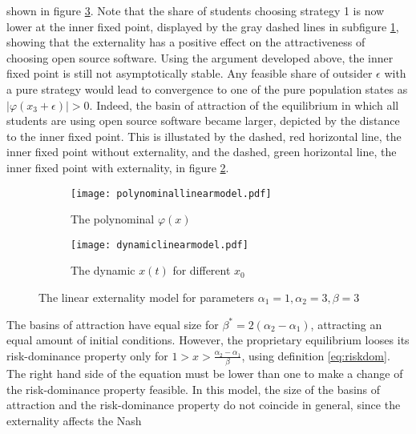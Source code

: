 shown in figure \ref{fig:plotmodellinear}.
Note that the share of students choosing strategy 1 is now lower at the 
inner fixed point, displayed by the gray dashed lines in subfigure 
\ref{fig:externalitypolynominal}, showing that the externality has a positive 
effect on the attractiveness of choosing open source software. 
Using the argument developed above, the inner fixed point is still not
asymptotically stable. Any feasible share of outsider $\epsilon$ 
with a pure strategy would lead to convergence to one of the 
pure population states as $|\varphi(x_3+\epsilon)|>0$.
Indeed, the basin of attraction of the equilibrium in which all 
students are using open source software became larger, 
depicted by the distance to the inner fixed point.
This is illustated by the dashed, red horizontal line, 
the inner fixed point without externality, and the dashed, green horizontal 
line, the inner fixed point with externality, 
in figure \ref{fig:dynamiclinear}.
\begin{figure}[h]
        \centering
        \begin{subfigure}{.5\textwidth}
        \centering
        \texttt{[image: polynominallinearmodel.pdf]}
        \caption[Polynominal of the externality model]{The polynominal $\varphi(x)$} 
        \label{fig:externalitypolynominal}
        \end{subfigure}%
        \begin{subfigure}{.5\textwidth}
        \centering
        \texttt{[image: dynamiclinearmodel.pdf]}
        \caption[Replicator dynamic of the model with externality]{The dynamic $x(t)$ for different $x_0$} 
        \label{fig:dynamiclinear}
        \end{subfigure}%
        \caption[Polynominal and Dynamic of the model with externality]
        {The linear externality 
                model for parameters $\alpha_1=1,\alpha_2=3,\beta=3$}
        \label{fig:plotmodellinear}
\end{figure}
The basins of attraction have equal size for $\beta^* = 2 (\alpha_2 -\alpha_1)$,
attracting an equal amount of initial conditions. However,
the proprietary equilibrium looses its risk-dominance property 
only for $1 > x > \frac{\alpha_2-\alpha_1}{\beta}  $, using definition 
\ref{eq:riskdom}. The right hand side of the equation must be lower than one 
to make a change of the risk-dominance property feasible. In this model,
the size of the basins of attraction and the risk-dominance
property do not coincide in general, since the externality affects the Nash 

